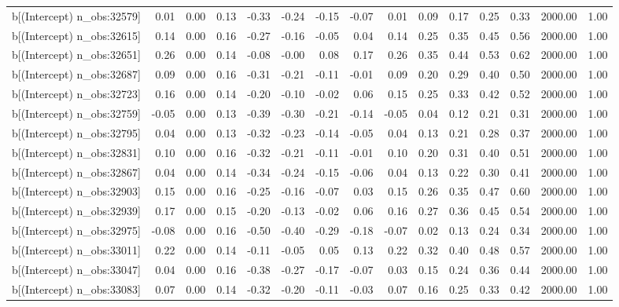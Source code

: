 \begin{table}[ht]
\begin{tabular}{rrrrrrrrrrrrrrr}
  b[(Intercept) n\_obs:32579] & 0.01 & 0.00 & 0.13 & -0.33 & -0.24 & -0.15 & -0.07 & 0.01 & 0.09 & 0.17 & 0.25 & 0.33 & 2000.00 & 1.00 \\ 
  b[(Intercept) n\_obs:32615] & 0.14 & 0.00 & 0.16 & -0.27 & -0.16 & -0.05 & 0.04 & 0.14 & 0.25 & 0.35 & 0.45 & 0.56 & 2000.00 & 1.00 \\ 
  b[(Intercept) n\_obs:32651] & 0.26 & 0.00 & 0.14 & -0.08 & -0.00 & 0.08 & 0.17 & 0.26 & 0.35 & 0.44 & 0.53 & 0.62 & 2000.00 & 1.00 \\ 
  b[(Intercept) n\_obs:32687] & 0.09 & 0.00 & 0.16 & -0.31 & -0.21 & -0.11 & -0.01 & 0.09 & 0.20 & 0.29 & 0.40 & 0.50 & 2000.00 & 1.00 \\ 
  b[(Intercept) n\_obs:32723] & 0.16 & 0.00 & 0.14 & -0.20 & -0.10 & -0.02 & 0.06 & 0.15 & 0.25 & 0.33 & 0.42 & 0.52 & 2000.00 & 1.00 \\ 
  b[(Intercept) n\_obs:32759] & -0.05 & 0.00 & 0.13 & -0.39 & -0.30 & -0.21 & -0.14 & -0.05 & 0.04 & 0.12 & 0.21 & 0.31 & 2000.00 & 1.00 \\ 
  b[(Intercept) n\_obs:32795] & 0.04 & 0.00 & 0.13 & -0.32 & -0.23 & -0.14 & -0.05 & 0.04 & 0.13 & 0.21 & 0.28 & 0.37 & 2000.00 & 1.00 \\ 
  b[(Intercept) n\_obs:32831] & 0.10 & 0.00 & 0.16 & -0.32 & -0.21 & -0.11 & -0.01 & 0.10 & 0.20 & 0.31 & 0.40 & 0.51 & 2000.00 & 1.00 \\ 
  b[(Intercept) n\_obs:32867] & 0.04 & 0.00 & 0.14 & -0.34 & -0.24 & -0.15 & -0.06 & 0.04 & 0.13 & 0.22 & 0.30 & 0.41 & 2000.00 & 1.00 \\ 
  b[(Intercept) n\_obs:32903] & 0.15 & 0.00 & 0.16 & -0.25 & -0.16 & -0.07 & 0.03 & 0.15 & 0.26 & 0.35 & 0.47 & 0.60 & 2000.00 & 1.00 \\ 
  b[(Intercept) n\_obs:32939] & 0.17 & 0.00 & 0.15 & -0.20 & -0.13 & -0.02 & 0.06 & 0.16 & 0.27 & 0.36 & 0.45 & 0.54 & 2000.00 & 1.00 \\ 
  b[(Intercept) n\_obs:32975] & -0.08 & 0.00 & 0.16 & -0.50 & -0.40 & -0.29 & -0.18 & -0.07 & 0.02 & 0.13 & 0.24 & 0.34 & 2000.00 & 1.00 \\ 
  b[(Intercept) n\_obs:33011] & 0.22 & 0.00 & 0.14 & -0.11 & -0.05 & 0.05 & 0.13 & 0.22 & 0.32 & 0.40 & 0.48 & 0.57 & 2000.00 & 1.00 \\ 
  b[(Intercept) n\_obs:33047] & 0.04 & 0.00 & 0.16 & -0.38 & -0.27 & -0.17 & -0.07 & 0.03 & 0.15 & 0.24 & 0.36 & 0.44 & 2000.00 & 1.00 \\ 
  b[(Intercept) n\_obs:33083] & 0.07 & 0.00 & 0.14 & -0.32 & -0.20 & -0.11 & -0.03 & 0.07 & 0.16 & 0.25 & 0.33 & 0.42 & 2000.00 & 1.00 \\ 

\end{tabular}
\end{table}
